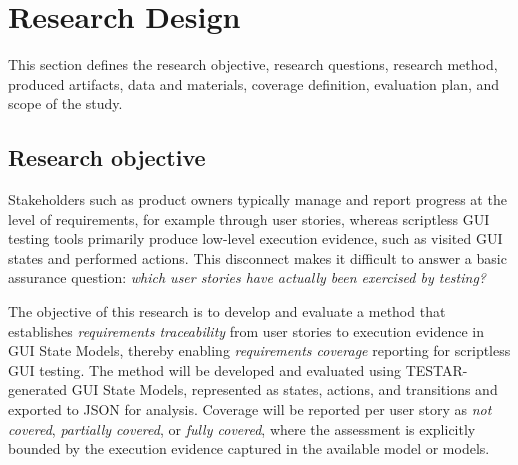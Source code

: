 



\section{Research Design}
\label{sec:research-design}

This section defines the research objective, research questions, research method, produced artifacts, data and materials, coverage definition, evaluation plan, and scope of the study.

\subsection{Research objective}
\label{subsec:research-objective}

Stakeholders such as product owners typically manage and report progress at the level of requirements, for example through user stories, whereas scriptless GUI testing tools primarily produce low-level execution evidence, such as visited GUI states and performed actions. This disconnect makes it difficult to answer a basic assurance question: \emph{which user stories have actually been exercised by testing?}

The objective of this research is to develop and evaluate a method that establishes \emph{requirements traceability} from user stories to execution evidence in GUI State Models, thereby enabling \emph{requirements coverage} reporting for scriptless GUI testing. The method will be developed and evaluated using TESTAR-generated GUI State Models, represented as states, actions, and transitions and exported to JSON for analysis. Coverage will be reported per user story as \emph{not covered}, \emph{partially covered}, or \emph{fully covered}, where the assessment is explicitly bounded by the execution evidence captured in the available model or models.

